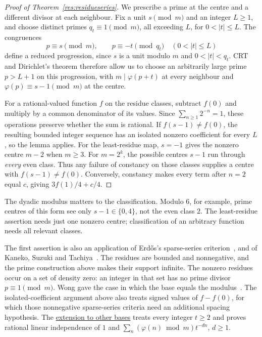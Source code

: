 \documentclass[11pt]{article}
\newcommand{\longrecord}[2]{\href{erdos249-totient-reasoning-surface.pdf\##1}{#2}}
\begin{document}
\begin{proof}[Proof of Theorem~\ref{res:residueseries}]
We prescribe a prime at the centre and a different divisor at each
neighbour. Fix a unit $s\pmod m$ and an integer $L\ge1$, and choose
distinct primes $q_t\equiv1\pmod m$, all exceeding $L$, for
$0<|t|\le L$. The congruences
\[
 p\equiv s\pmod m,\qquad p\equiv-t\pmod{q_t}\quad(0<|t|\le L)
\]
define a reduced progression, since $s$ is a unit modulo $m$ and
$0<|t|<q_t$. CRT and Dirichlet's theorem therefore allow us to choose
an arbitrarily large prime $p>L+1$ on this progression, with
$m\mid\varphi(p+t)$ at every neighbour and
$\varphi(p)\equiv s-1\pmod m$ at the centre.

For a rational-valued function $f$ on the residue classes, subtract
$f(0)$ and multiply by a common denominator of its values. Since
$\sum_{n\ge1}2^{-n}=1$, these operations preserve whether the sum is
rational. If $f(s-1)\ne f(0)$, the resulting bounded integer sequence
has an isolated nonzero coefficient for every $L$, so the lemma
applies.
For the least-residue map, $s=-1$ gives the nonzero centre $m-2$
when $m\ge3$. For $m=2^k$, the possible centres $s-1$ run through
\emph{every} even class. Thus any failure of constancy on those
classes supplies a centre with $f(s-1)\ne f(0)$.
Conversely, constancy makes every term after $n=2$ equal $c$, giving
$3f(1)/4+c/4$.
\end{proof}
The dyadic modulus matters to the classification. Modulo $6$, for
example, prime centres of this form see only $s-1\in\{0,4\}$, not
the even class $2$. The least-residue assertion needs just one
nonzero centre; classification of an arbitrary function needs all
relevant classes.

The first assertion is also an application of Erd\H{o}s's sparse-series
criterion~\cite[Lem.~1, p.~213]{erdos1957}, and of Kaneko, Suzuki and
Tachiya~\cite[Thm.~3]{kst2026}. The residues are bounded and nonnegative,
and the prime construction above makes their support infinite.
The nonzero residues occur on a set of density zero: an integer in that
set has no prime divisor
$p\equiv1\pmod m$. Wong gave the case in which the base equals the
modulus~\cite{wong2015}. The isolated-coefficient argument above also
treats signed values of $f-f(0)$, for which those nonnegative
sparse-series criteria need an additional spacing hypothesis.
The \longrecord{long249-r3-residue-extension}{extension to other bases}
treats every integer $t\ge2$ and proves rational linear
independence of $1$ and $\sum_n(\varphi(n)\bmod m)t^{-dn}$, $d\ge1$.
\end{document}
